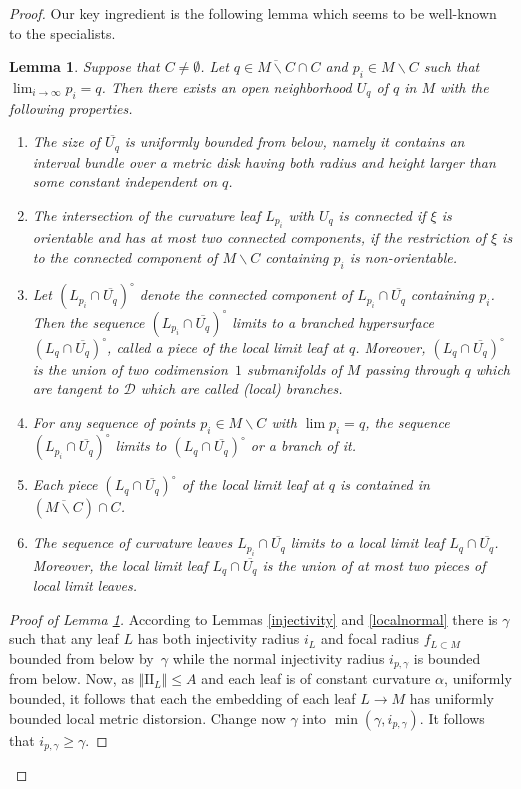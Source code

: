 \documentclass[10pt]{amsart}
\let\mathcal\mathscr
\let\moins\smallsetminus
\newcommand{\II}{\mathrm{II}}
\let\parallel\Vert
\newtheorem{lemma}[theorem]{Lemma}
\theoremstyle{definition}
\theoremstyle{remark}
\numberwithin{equation}{section}
\begin{document}
\begin{proof}
Our key ingredient is the following lemma which seems to be well-known to the specialists.
\begin{lemma}\label{convergence}
Suppose that $C\neq \emptyset$.
Let $q\in \overline{M\moins C}\cap C$ and $p_i\in M\moins C$ such that $\lim_{i\to \infty}p_i=q$. Then there exists an open
neighborhood $U_q$ of $q$ in $M$ with the following properties.
\begin{enumerate}
\item The size of $ \overline{U_q}$ is uniformly bounded from below, namely it contains an interval bundle over a metric disk having both radius and
height larger than some constant independent on $q$.
\item\label{convergence2} The intersection of the curvature leaf $L_{p_i}$ with $U_q$ is connected if $\xi$ is orientable and has at most
two connected components, if the restriction of $\xi$ is to the connected component of $M\moins C$ containing $p_i$ is non-orientable.
\item Let $(L_{p_i}\cap \overline{U_q})^{\circ}$ denote the connected component of $L_{p_i}\cap \overline{U_q}$ containing $p_i$.
Then the sequence $(L_{p_i}\cap \overline{U_q})^{\circ}$ limits to a branched hypersurface
$(L_q\cap \overline{U_q})^{\circ}$, called a piece of the local limit leaf at $q$. Moreover, $(L_q\cap \overline{U_q})^{\circ}$ is the union of two
codimension~$1$ submanifolds of $M$ passing through $q$ which are tangent to $\mathcal D$ which are called (local) branches.
\item\label{convergence4} For any sequence of points $p_i\in M\moins C$ with $\lim p_i=q$,
the sequence $(L_{p_i}\cap \overline{U_q})^{\circ}$ limits to $(L_q\cap \overline{U_q})^{\circ}$ or a branch of it.
\item Each piece $(L_q\cap \overline{U_q})^{\circ}$ of the local limit leaf at $q$ is contained in $(\overline{M\moins C})\cap C$.
\item The sequence of curvature leaves $L_{p_i}\cap \overline{U_q}$ limits to a local limit leaf $L_q\cap \overline{U_q}$.
Moreover, the local limit leaf $L_q\cap \overline{U_q}$ is the union of at most
two pieces of local limit leaves.
\end{enumerate}
\end{lemma}
\begin{proof}[Proof of Lemma \ref{convergence}]
According to Lemmas \ref{injectivity} and \ref{localnormal} there is $\gamma$ such that any leaf $L$
has both injectivity radius $i_L$ and focal radius $f_{L\subset M}$ bounded from below by~$\gamma$ while the normal injectivity radius
$i_{p, \gamma}$ is bounded from below. Now, as $\parallel \II_{L} \parallel \leq A$ and each leaf is of constant curvature $\alpha$, uniformly bounded, it follows that each the embedding of each leaf $L\to M$ has uniformly bounded local metric distorsion.
Change now $\gamma$ into $\min(\gamma, i_{p,\gamma})$.
It follows that $i_{p,\gamma}\geq\gamma$.


\end{proof}
\end{proof}
\end{document}
